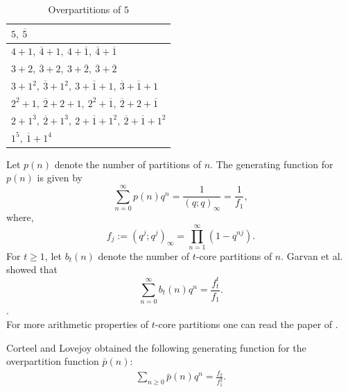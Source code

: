\documentclass[12pt,oneside,reqno]{amsart}
\numberwithin{equation}{section}
\begin{document}
\begin{table}[H]
	\centering
	\caption{Overpartitions of $5$}
	\label{table1}
	\renewcommand{\arraystretch}{1.3}
	\begin{tabular}{|p{}|}
		\hline
		
		$5,\ \overline{5}$ \\ \hline
		
		$4+1,\ \overline{4}+1,\ 4+\overline{1},\
		\overline{4}+\overline{1}$ \\ \hline
		
		$3+2,\ \overline{3}+2,\ 3+\overline{2},\
		\overline{3}+\overline{2}$ \\ \hline
		
		$3+1^2,\ \overline{3}+1^2,\ 3+\overline{1}+1,\
		\overline{3}+\overline{1}+1$ \\ \hline
		
		$2^2+1,\ \overline{2}+2+1,\ 2^2+\overline{1},\
		\overline{2}+2+\overline{1}$ \\ \hline
		
		$2+1^3,\ \overline{2}+1^3,\ 2+\overline{1}+1^2,\
		\overline{2}+\overline{1}+1^2$ \\ \hline
		
		$1^5,\ \overline{1}+1^4$ \\ \hline
		
	\end{tabular}
\end{table}
Let $p(n)$ denote the number of partitions of $n$. The generating
function for $p(n)$ is given by
\begin{equation}\label{eq1.1}
\sum_{n=0}^{\infty}p(n)q^n
=
\frac{1}{(q;q)_\infty}
=
\frac{1}{f_1},
\end{equation}
where, 
\[
f_j:=(q^j;q^j)_\infty
=\prod_{n=1}^{\infty}(1-q^{nj}).
\]
For $t\geq 1$, let $b_t(n)$ denote the number of $t$-core partitions of
$n$. Garvan et al.\cite{GarvanKimStanton1990} showed that
\begin{equation}\label{eq1.2}
	\sum_{n=0}^{\infty}b_t(n)q^n
	=
	\frac{f_t^t}{f_1}.
\end{equation}.\\ For more arithmetic properties of  $t$-core partitions one can read the paper of \cite{JindalMeher2024}.
 
	Corteel and Lovejoy \cite{Lovejoy2004} obtained the following generating function for the overpartition function $\bar{p}(n)$:
	\begin{align}\label{eq1.3}
		\sum_{n\geq0}\bar{p}(n)q^n=\frac{f_2}{f_1^2}.
	\end{align}
	
\end{document}
